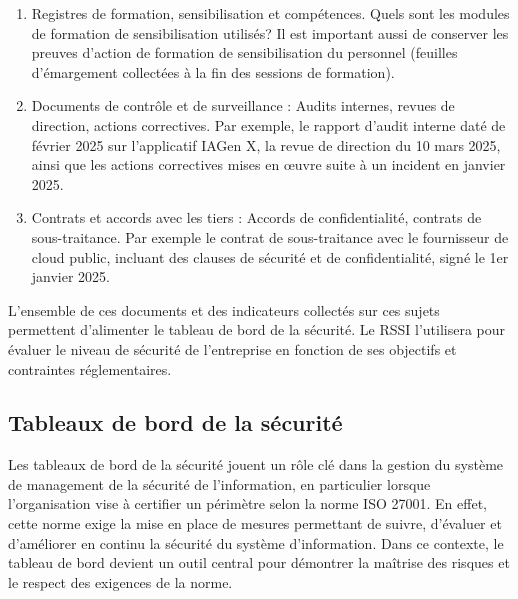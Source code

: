 \begin{enumerate}
    \item Registres de formation, sensibilisation et compétences. Quels sont les modules de formation de sensibilisation utilisés? Il est important aussi de conserver les preuves d'action de formation de sensibilisation du personnel (feuilles d'émargement collectées à la fin des sessions de formation).
    \item Documents de contrôle et de surveillance : Audits internes, revues de direction, actions correctives. Par exemple, le rapport d’audit interne daté de février 2025 sur l'applicatif IAGen X, la revue de direction du 10 mars 2025, ainsi que les actions correctives mises en œuvre suite à un incident en janvier 2025.
    \item Contrats et accords avec les tiers : Accords de confidentialité, contrats de sous-traitance. Par exemple le contrat de sous-traitance avec le fournisseur de cloud public, incluant des clauses de sécurité et de confidentialité, signé le 1er janvier 2025.
\end{enumerate}

L'ensemble de ces documents et des indicateurs collectés sur ces sujets permettent d'alimenter le tableau de bord de la sécurité.
Le RSSI l'utilisera pour évaluer le niveau de sécurité de l'entreprise en fonction de ses objectifs et contraintes réglementaires.

\subsection{Tableaux de bord de la sécurité}



Les tableaux de bord de la sécurité jouent un rôle clé dans la gestion du système de management de la sécurité de l'information, en particulier lorsque l'organisation vise à certifier un périmètre selon la norme ISO 27001. En effet, cette norme exige la mise en place de mesures permettant de suivre, d’évaluer et d’améliorer en continu la sécurité du système d’information. Dans ce contexte, le tableau de bord devient un outil central pour démontrer la maîtrise des risques et le respect des exigences de la norme.


